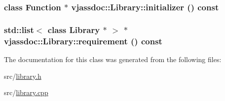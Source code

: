 \hypertarget{classvjassdoc_1_1Library_99bc875c90c8ca4062dcddc8c4f7c8c6}{
\subsubsection{\setlength{\rightskip}{0pt plus 5cm}class {\bf Function} $\ast$ vjassdoc::Library::initializer () const}}
\label{classvjassdoc_1_1Library_99bc875c90c8ca4062dcddc8c4f7c8c6}


\hypertarget{classvjassdoc_1_1Library_aa5627b4a2e5b730d3dbc7d141a0e6ef}{
\subsubsection{\setlength{\rightskip}{0pt plus 5cm}std::list$<$ class {\bf Library} $\ast$ $>$ $\ast$ vjassdoc::Library::requirement () const}}
\label{classvjassdoc_1_1Library_aa5627b4a2e5b730d3dbc7d141a0e6ef}




The documentation for this class was generated from the following files:\begin{CompactItemize}
\item 
src/\hyperlink{library_8h}{library.h}\item 
src/\hyperlink{library_8cpp}{library.cpp}\end{CompactItemize}
